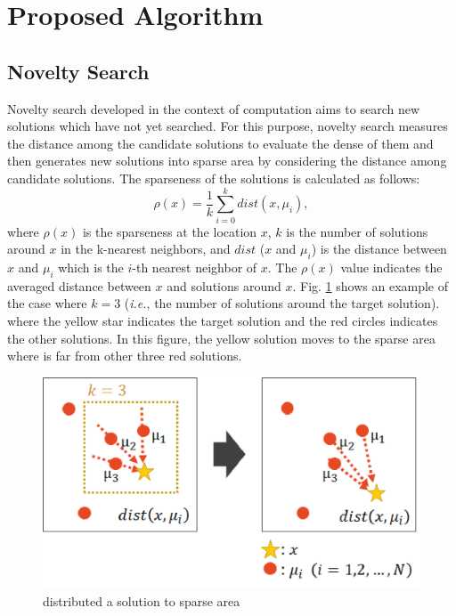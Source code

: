 \documentclass{ies2018}
\begin{document}


\section{Proposed Algorithm}

\subsection{Novelty Search}
Novelty search \cite{noveltysearch} developed in the context of computation aims to search new solutions which have not yet searched. For this purpose, novelty search measures the distance among the candidate solutions to evaluate the dense of them and then generates new solutions into sparse area by considering the distance among candidate solutions. The sparseness of the solutions is calculated as follows:
\begin{equation}
\rho(x)=\frac{1}{k}\sum_{i=0}^k dist(x,\mu_i),
\label{eq:nov}
\end{equation}
where ${\rho(x)}$ is the sparseness at the location ${x}$, $k$ is the number of solutions around $x$ in the k-nearest neighbors, and $dist$ ($x$ and $\mu_i$) is the distance between $x$ and $\mu_i$ which is the $i$-th nearest neighbor of $x$. The $\rho(x)$ value indicates the averaged distance between $x$ and solutions around $x$. Fig. \ref{fig:n_dist} shows an example of the case where $k = 3$ (\textit{i.e.}, the number of solutions around the target solution).  where the yellow star indicates the target solution and the red circles indicates the other solutions. In this figure, the yellow solution moves to the sparse area where is far from other three red solutions. 

\begin{figure}[h]
\begin{center}
\includegraphics[width=1.0\linewidth]{eps/ns.eps}
\end{center}
\caption{distributed a solution to sparse area}
\label{fig:n_dist}
\end{figure}
\end{document}
